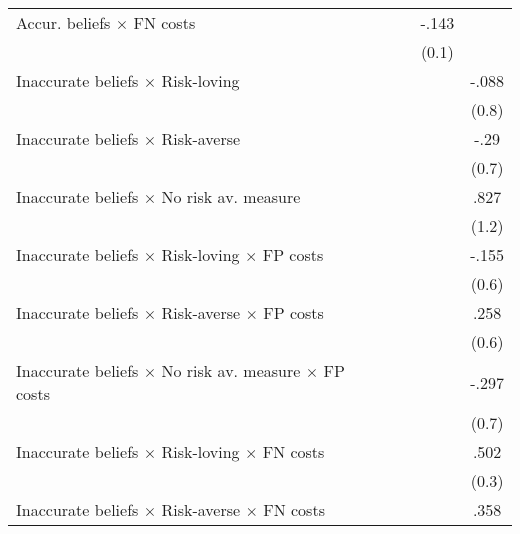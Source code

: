 \begin{table}[htbp]
\begin{tabular}{l*{4}{c}}
Accur. beliefs $\times$ FN costs&                  &                  &    -.143         &                  \\
                &                  &                  &    (0.1)         &                  \\
Inaccurate beliefs $\times$ Risk-loving&                  &                  &                  &    -.088         \\
                &                  &                  &                  &    (0.8)         \\
Inaccurate beliefs $\times$ Risk-averse&                  &                  &                  &     -.29         \\
                &                  &                  &                  &    (0.7)         \\
Inaccurate beliefs $\times$ No risk av. measure&                  &                  &                  &     .827         \\
                &                  &                  &                  &    (1.2)         \\
Inaccurate beliefs $\times$ Risk-loving $\times$ FP costs&                  &                  &                  &    -.155         \\
                &                  &                  &                  &    (0.6)         \\
Inaccurate beliefs $\times$ Risk-averse $\times$ FP costs&                  &                  &                  &     .258         \\
                &                  &                  &                  &    (0.6)         \\
Inaccurate beliefs $\times$ No risk av. measure $\times$ FP costs&                  &                  &                  &    -.297         \\
                &                  &                  &                  &    (0.7)         \\
Inaccurate beliefs $\times$ Risk-loving $\times$ FN costs&                  &                  &                  &     .502         \\
                &                  &                  &                  &    (0.3)         \\
Inaccurate beliefs $\times$ Risk-averse $\times$ FN costs&                  &                  &                  &     .358         \\

\end{tabular}
\end{table}
